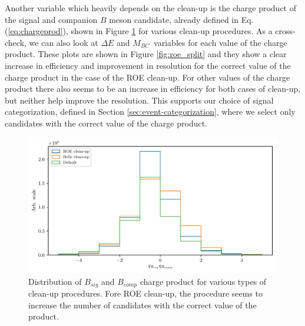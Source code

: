 \documentclass[headings=standardclasses,headings=big,oneside,a4paper,openany,12pt]{scrbook}
\newcommand {\vars}{$\Delta E$ and $M_{BC}$}
\begin{document}
Another variable which heavily depends on the clean-up is the charge product of the signal and companion $B$ meson candidate, already defined in Eq. (\ref{eq:chargeprod}), shown in Figure \ref{fig:roe_chargeproduct} for various clean-up procedures. As a cross-check, we can also look at \vars~variables for each value of the charge product. These plots are shown in Figure \ref{fig:roe_split} and they show a clear increase in efficiency and improvement in resolution for the correct value of the charge product in the case of the ROE clean-up. For other values of the charge product there also seems to be an increase in efficiency for both cases of clean-up, but neither help improve the resolution. This supports our choice of signal categorization, defined in Section \ref{sec:event-categorization}, where we select only candidates with the correct value of the charge product.

\begin{figure}[H]
\centering
\captionsetup{width=0.8\linewidth}
\includegraphics[width=\linewidth]{fig/roe_chargeprod}
\caption{Distribution of $B_{sig}$ and $B_{comp}$ charge product for various types of clean-up procedures. Fore ROE clean-up, the procedure seems to increase the number of candidates with the correct value of the product.}
\label{fig:roe_chargeproduct}
\end{figure}
\end{document}
